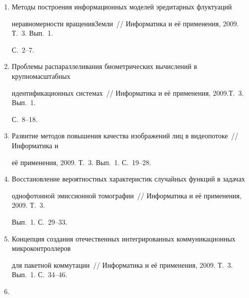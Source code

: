 \begin{enumerate}[1.]


\item {}


Методы построения информационных моделей эредитарных флуктуаций 


неравномерности вращения\linebreak Земли~// Информатика и её применения, 2009. Т.~3. Вып.~1. 


С.~2--7.


\item {}


Проблемы распараллеливания биометрических вычислений в крупномасштабных 


идентификационных системах~// Информатика и её применения, 2009.\linebreak Т.~3. Вып.~1. 


С.~8--18.





\item {}


Развитие методов повышения качества изображений лиц в видеопотоке~// Информатика и 


её применения, 2009. Т.~3. Вып.~1. С.~19--28.





\item {}


Восстановление вероятностных характеристик случайных функций в задачах 


од\-но\-фо\-тон\-ной эмиссионной томографии~// Информатика и её применения, 2009. Т.~3. 


Вып.~1. С.~29--33.





\item {}


Концепция создания отечественных ин\-тег\-ри\-ро\-ван\-ных ком\-му\-ни\-ка\-ци\-он\-ных микроконтроллеров 


для пакетной коммутации~// Информатика и её применения, 2009. Т.~3. Вып.~1. С.~34--46.





\item {}



\end{enumerate}
